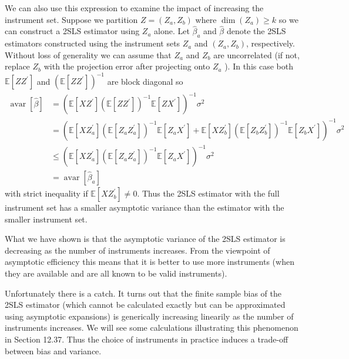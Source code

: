 \documentclass[10pt]{article}
\begin{document}
We can also use this expression to examine the impact of increasing the instrument set. Suppose we partition $Z=\left(Z_{a}, Z_{b}\right)$ where $\operatorname{dim}\left(Z_{a}\right) \geq k$ so we can construct a 2SLS estimator using $Z_{a}$ alone. Let $\widehat{\beta}_{a}$ and $\widehat{\beta}$ denote the 2SLS estimators constructed using the instrument sets $Z_{a}$ and $\left(Z_{a}, Z_{b}\right)$, respectively. Without loss of generality we can assume that $Z_{a}$ and $Z_{b}$ are uncorrelated (if not, replace $Z_{b}$ with the projection error after projecting onto $Z_{a}$ ). In this case both $\mathbb{E}\left[Z Z^{\prime}\right]$ and $\left(\mathbb{E}\left[Z Z^{\prime}\right]\right)^{-1}$ are block diagonal so
$$
\begin{aligned}
\operatorname{avar}[\widehat{\beta}] &=\left(\mathbb{E}\left[X Z^{\prime}\right]\left(\mathbb{E}\left[Z Z^{\prime}\right]\right)^{-1} \mathbb{E}\left[Z X^{\prime}\right]\right)^{-1} \sigma^{2} \\
&=\left(\mathbb{E}\left[X Z_{a}^{\prime}\right]\left(\mathbb{E}\left[Z_{a} Z_{a}^{\prime}\right]\right)^{-1} \mathbb{E}\left[Z_{a} X^{\prime}\right]+\mathbb{E}\left[X Z_{b}^{\prime}\right]\left(\mathbb{E}\left[Z_{b} Z_{b}^{\prime}\right]\right)^{-1} \mathbb{E}\left[Z_{b} X^{\prime}\right]\right)^{-1} \sigma^{2} \\
& \leq\left(\mathbb{E}\left[X Z_{a}^{\prime}\right]\left(\mathbb{E}\left[Z_{a} Z_{a}^{\prime}\right]\right)^{-1} \mathbb{E}\left[Z_{a} X^{\prime}\right]\right)^{-1} \sigma^{2} \\
&=\operatorname{avar}\left[\widehat{\beta}_{a}\right]
\end{aligned}
$$
with strict inequality if $\mathbb{E}\left[X Z_{b}^{\prime}\right] \neq 0$. Thus the 2SLS estimator with the full instrument set has a smaller asymptotic variance than the estimator with the smaller instrument set.

What we have shown is that the asymptotic variance of the 2SLS estimator is decreasing as the number of instruments increases. From the viewpoint of asymptotic efficiency this means that it is better to use more instruments (when they are available and are all known to be valid instruments).

Unfortunately there is a catch. It turns out that the finite sample bias of the 2SLS estimator (which cannot be calculated exactly but can be approximated using asymptotic expansions) is generically increasing linearily as the number of instruments increases. We will see some calculations illustrating this phenomenon in Section 12.37. Thus the choice of instruments in practice induces a trade-off between bias and variance.
\end{document}
